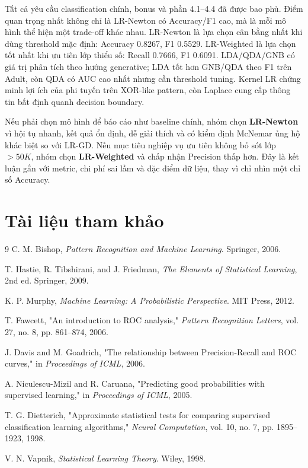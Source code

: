 \documentclass[12pt,a4paper]{article}
\begin{document}
Tất cả yêu cầu classification chính, bonus và phần 4.1--4.4 đã được bao phủ. Điểm quan trọng nhất không chỉ là LR-Newton có Accuracy/F1 cao, mà là mỗi mô hình thể hiện một trade-off khác nhau. LR-Newton là lựa chọn cân bằng nhất khi dùng threshold mặc định: Accuracy 0.8267, F1 0.5529. LR-Weighted là lựa chọn tốt nhất khi ưu tiên lớp thiểu số: Recall 0.7666, F1 0.6091. LDA/QDA/GNB có giá trị phân tích theo hướng generative; LDA tốt hơn GNB/QDA theo F1 trên Adult, còn QDA có AUC cao nhất nhưng cần threshold tuning. Kernel LR chứng minh lợi ích của phi tuyến trên XOR-like pattern, còn Laplace cung cấp thông tin bất định quanh decision boundary.

Nếu phải chọn mô hình để báo cáo như baseline chính, nhóm chọn \textbf{LR-Newton} vì hội tụ nhanh, kết quả ổn định, dễ giải thích và có kiểm định McNemar ủng hộ khác biệt so với LR-GD. Nếu mục tiêu nghiệp vụ ưu tiên không bỏ sót lớp $>50K$, nhóm chọn \textbf{LR-Weighted} và chấp nhận Precision thấp hơn. Đây là kết luận gắn với metric, chi phí sai lầm và đặc điểm dữ liệu, thay vì chỉ nhìn một chỉ số Accuracy.

\section*{Tài liệu tham khảo}

\begin{thebibliography}{9}
C. M. Bishop, \textit{Pattern Recognition and Machine Learning}. Springer, 2006.

T. Hastie, R. Tibshirani, and J. Friedman, \textit{The Elements of Statistical Learning}, 2nd ed. Springer, 2009.

K. P. Murphy, \textit{Machine Learning: A Probabilistic Perspective}. MIT Press, 2012.

T. Fawcett, "An introduction to ROC analysis," \textit{Pattern Recognition Letters}, vol. 27, no. 8, pp. 861--874, 2006.

J. Davis and M. Goadrich, "The relationship between Precision-Recall and ROC curves," in \textit{Proceedings of ICML}, 2006.

A. Niculescu-Mizil and R. Caruana, "Predicting good probabilities with supervised learning," in \textit{Proceedings of ICML}, 2005.

T. G. Dietterich, "Approximate statistical tests for comparing supervised classification learning algorithms," \textit{Neural Computation}, vol. 10, no. 7, pp. 1895--1923, 1998.

V. N. Vapnik, \textit{Statistical Learning Theory}. Wiley, 1998.
\end{thebibliography}
\end{document}
